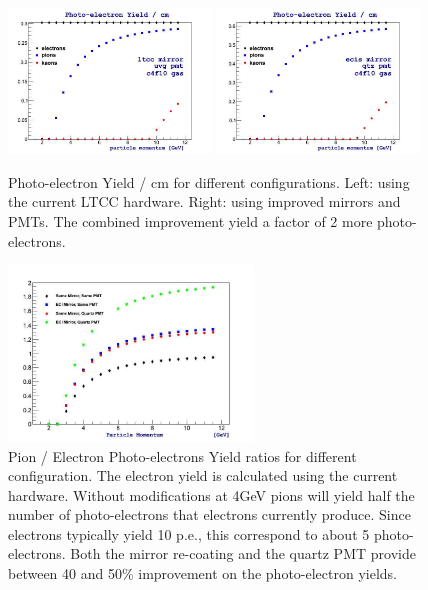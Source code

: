 \documentclass{article}
\begin{document}
\clearpage\newpage
\begin{figure}[ht]
	\centering
	\includegraphics[width=0.48\textwidth]{img/photon_yield_gasc4f10_mirrorltcc_pmtuvg.jpg}
	\includegraphics[width=0.48\textwidth]{img/photon_yield_gasc4f10_mirrorecis_pmtqtz.jpg}
	\caption{\scriptsize Photo-electron Yield / cm for different configurations. Left: using the current LTCC hardware. Right: using 
	improved mirrors and PMTs. The combined improvement yield a factor of 2 more photo-electrons.}
	\label{fig:yields}
\end{figure}

\begin{figure}[ht]
	\centering
	\includegraphics[width=0.58\textwidth]{img/photon_yield_ratios_pion_gasc4f10_mirrorecis_pmtqtz.jpg}
	\caption{\scriptsize Pion / Electron Photo-electrons Yield ratios for different configuration. The electron yield
	is calculated using the current hardware. Without modifications at 4GeV pions will yield half the number of photo-electrons
	that electrons currently produce. Since electrons typically yield 10 p.e., this correspond to about 5 photo-electrons.
	Both the mirror re-coating and the quartz PMT provide between 40 and 50\% improvement on the photo-electron yields.}
	\label{fig:ratios}
\end{figure}
\end{document}
